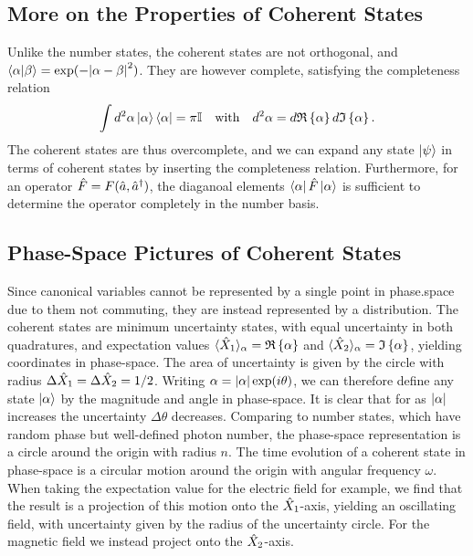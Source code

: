 \subsection{More on the Properties of Coherent States}
Unlike the number states, the coherent states are not orthogonal, and $\bra{\alpha}\ket{\beta} = \mathrm{exp} (-\abs{\alpha - \beta}^2)$. They are however complete, satisfying the completeness relation 
\begin{equation}
    \int d^2\alpha \ket{\alpha}\bra{\alpha} = \pi \mathbb{I} \quad\text{with}\quad d^2\alpha = d\mathfrak{R}\left\{ \alpha \right\} d\mathfrak{I}\left\{ \alpha \right\}.
\end{equation}
The coherent states are thus overcomplete, and we can expand any state $\ket{\psi}$ in terms of coherent states by inserting the completeness relation. Furthermore, for an operator $\hat{F} = F(\hat{a}, \hat{a}^\dagger)$, the diaganoal elements $\bra{\alpha} \hat{F} \ket{\alpha}$ is sufficient to determine the operator completely in the number basis.

\subsection{Phase-Space Pictures of Coherent States}
Since canonical variables cannot be represented by a single point in phase.space due to them not commuting, they are instead represented by a distribution. The coherent states are minimum uncertainty states, with equal uncertainty in both quadratures, and expectation values $\langle{\hat{X}_1}\rangle_\alpha = \mathfrak{R}\left\{ \alpha \right\}$ and $\langle{\hat{X}_2}\rangle_\alpha = \mathfrak{I}\left\{ \alpha \right\}$, yielding coordinates in phase-space. The area of uncertainty is given by the circle with radius $\Delta \hat{X}_1 = \Delta \hat{X}_2 = 1/2$. Writing $\alpha = \abs{\alpha} \exp(i\theta)$, we can therefore define any state $\ket{\alpha}$ by the magnitude and angle in phase-space. It is clear that for as $\abs{\alpha}$ increases the uncertainty $\Delta \theta$ decreases. Comparing to number states, which have random phase but well-defined photon number, the phase-space representation is a circle around the origin with radius $n$. The time evolution of a coherent state in phase-space is a circular motion around the origin with angular frequency $\omega$. When taking the expectation value for the electric field for example, we find that the result is a projection of this motion onto the $\hat{X}_1$-axis, yielding an oscillating field, with uncertainty given by the radius of the uncertainty circle. For the magnetic field we instead project onto the $\hat{X}_2$-axis.

